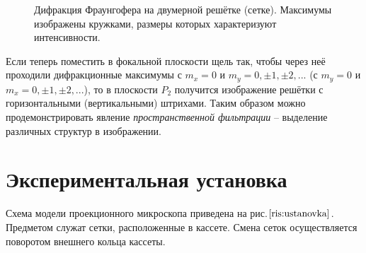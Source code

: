 \documentclass[a4paper,12pt]{article}
\begin{document}
	\begin{figure}[h]
		\caption{Дифракция Фраунгофера на двумерной решётке (сетке). Максимумы изображены кружками, размеры которых характеризуют интенсивности.}
		\label{fig:max}
	\end{figure}
	
	Если теперь поместить в фокальной плоскости щель так, чтобы через неё проходили дифракционные максимумы с $m_x = 0$ и $m_y =0, \pm 1, \pm 2, ...$ (с $m_y = 0$ и $m_x =0, \pm 1, \pm 2, ...$), то в плоскости $P_2$ получится изображение решётки с горизонтальными (вертикальными) штрихами. Таким образом можно продемонстрировать явление \textit{пространственной фильтрации} -- выделение различных структур в изображении.
	
\newpage

\section*{Экспериментальная установка}
	Схема модели проекционного микроскопа приведена на рис.$\ref{ris:ustanovka}$. Предметом служат сетки, расположенные в кассете. Смена сеток осуществляется поворотом внешнего кольца кассеты.
	
\end{document}
